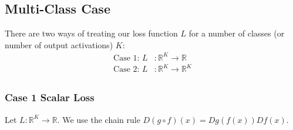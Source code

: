 \subsection{Multi-Class Case}

There are two ways of treating our loss function $L$ for a number of classes (or number of output activations) $K$:
\begin{align}
    \text{Case 1: } L &: \mathbb{R}^K \to \mathbb{R}\\
    \text{Case 2: } L &: \mathbb{R}^K \to \mathbb{R}^K\\
\end{align}

\subsubsection{Case 1 Scalar Loss}

Let $L : \mathbb{R}^K \to \mathbb{R}$. We use the chain rule $D (g \circ f) (x) = Dg(f(x))Df(x)$. 

